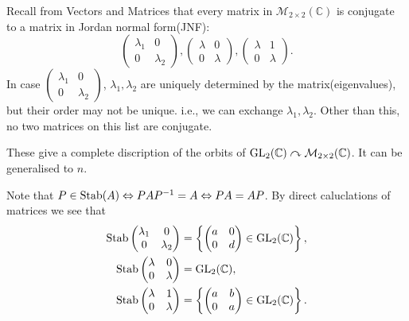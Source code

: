 \documentclass[a4paper]{article}
\begin{document}
\begin{example}
  Recall from Vectors and Matrices that every matrix in $
  \mathcal{M}_{2\times 2}(\mathbb{C}) $ is conjugate to a matrix in
  Jordan normal form(JNF):
  \[
    \begin{pmatrix}
      \lambda_1&0\\
      0&\lambda_2
    \end{pmatrix},
    \begin{pmatrix}
      \lambda&0\\
      0&\lambda
    \end{pmatrix},
    \begin{pmatrix}
      \lambda&1\\
      0&\lambda
    \end{pmatrix}.
  \]
  In case $
  \begin{pmatrix}
    \lambda_1&0\\
    0&\lambda_2
  \end{pmatrix}$, $ \lambda_1,\lambda_2 $ are uniquely determined by
  the matrix(eigenvalues), but their order may not be unique. i.e.,
  we can exchange $ \lambda_1,\lambda_2 $. Other than this, no two
  matrices on this list are conjugate.

  These give a complete discription of the orbits of $
  \mathrm{GL}_2(\mathbb{C})\curvearrowright \mathcal{M}_{2\times
  2}(\mathbb{C}) $. It can be generalised to $n$.

  Note that $ P\in \operatorname{Stab}(A)\Leftrightarrow PAP^{-1}=A \Leftrightarrow
  PA=AP $. By direct caluclations of matrices we see that
  \begin{align*}
    \operatorname{Stab}
    \begin{pmatrix}
      \lambda_1&0\\
      0&\lambda_2
    \end{pmatrix} &= \left\{
      \begin{pmatrix}
        a&0\\
        0&d
    \end{pmatrix}\in \mathrm{GL}_2(\mathbb{C}) \right\},\\
    \operatorname{Stab}
    \begin{pmatrix}
      \lambda&0\\
      0&\lambda
    \end{pmatrix}&= \mathrm{GL}_2(\mathbb{C}),\\
    \operatorname{Stab}
    \begin{pmatrix}
      \lambda&1\\
      0&\lambda
    \end{pmatrix}&=\left\{
      \begin{pmatrix}
        a&b\\
        0&a
    \end{pmatrix}\in \mathrm{GL}_2(\mathbb{C}) \right\}.
  \end{align*}
\end{example}
\end{document}
